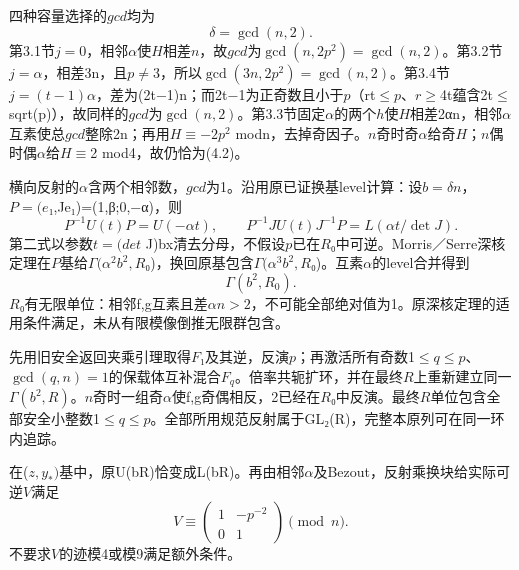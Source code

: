 {四种容量选择的\ensuremath{gcd}均为} \[
\boxed{\delta=\gcd(n,2).}
\tag{C18.4.2}
\] {第3.1节\ensuremath{j=0}，相邻\ensuremath{\alpha }使\ensuremath{H}相差\ensuremath{n}，故\ensuremath{gcd}为\ensuremath{\operatorname{gcd}(n,2p^{2})=\operatorname{gcd}(n,2)}。第3.2节\ensuremath{j=\alpha }，相差3n，且\ensuremath{p}\ensuremath{\ne}3，所以\ensuremath{\operatorname{gcd}(3n,2p^{2})=\operatorname{gcd}(n,2)}。第3.4节\ensuremath{j=(t-1)\alpha }，差为(2t−1)n；而2t−1为正奇数且小于\ensuremath{p}（rt\ensuremath{\le}\ensuremath{p}、\ensuremath{r}\ensuremath{\ge}4t蕴含2t\ensuremath{\le}sqrt(p)），故同样的\ensuremath{gcd}为\ensuremath{\operatorname{gcd}(n,2)}。第3.3节固定\ensuremath{\alpha }的两个\ensuremath{h}使\ensuremath{H}相差2αn，相邻\ensuremath{\alpha }互素使总\ensuremath{gcd}整除2n；再用\ensuremath{H}\ensuremath{\equiv}−\ensuremath{2p^{2}}} {modn，去掉奇因子。\ensuremath{n}奇时奇\ensuremath{\alpha }给奇\ensuremath{H}；\ensuremath{n}偶时偶\ensuremath{\alpha }给\ensuremath{H}\ensuremath{\equiv}2} {mod4，故仍恰为(4.2)。}

{横向反射的\ensuremath{\alpha }含两个相邻数，\ensuremath{gcd}为1。沿用原已证换基level计算：设\ensuremath{b=\delta n}，\ensuremath{P=(e}₁,Je₁)=(1,β;0,−α)，则} \[
P^{-1}U(t)P=U(-\alpha t),\qquad
P^{-1}JU(t)J^{-1}P=L(\alpha t/\det J).
\] {第二式以参数\ensuremath{t=(det}} {J)bx清去分母，不假设\ensuremath{p}已在\ensuremath{R}₀中可逆。Morris／Serre深核定理在\ensuremath{P}基给\ensuremath{\Gamma (\alpha ^{2}b^{2},R}₀)，换回原基包含\ensuremath{\Gamma (\alpha ^{3}b^{2},R}₀)。互素\ensuremath{\alpha }的level合并得到} \[
\boxed{\Gamma(b^2,R_0).}
\tag{C18.4.3}
\] {\ensuremath{R}₀有无限单位：相邻f,g互素且差\ensuremath{\alpha n>2}，不可能全部绝对值为1。原深核定理的适用条件满足，未从有限模像倒推无限群包含。}

{先用旧安全返回夹乘引理取得\ensuremath{F}₁及其逆，反演\ensuremath{p}；再激活所有奇数1\ensuremath{\le}\ensuremath{q}\ensuremath{\le}\ensuremath{p}、\ensuremath{\operatorname{gcd}(q,n)=1}的保载体互补混合\ensuremath{F_{q}}。倍率共轭扩环，并在最终\ensuremath{R}上重新建立同一\ensuremath{\Gamma (b^{2},R)}。\ensuremath{n}奇时一组奇\ensuremath{\alpha }使f,g奇偶相反，2已经在\ensuremath{R}₀中反演。最终\ensuremath{R}单位包含全部安全小整数1\ensuremath{\le}\ensuremath{q}\ensuremath{\le}\ensuremath{p}。全部所用规范反射属于GL₂(R)，完整本原列可在同一环内追踪。}

{在(\ensuremath{z,y_*)}基中，原U(bR)恰变成L(bR)。再由相邻\ensuremath{\alpha }及Bezout，反射乘换块给实际可逆\ensuremath{V}满足} \[
V\equiv\begin{pmatrix}1&-p^{-2}\\0&1\end{pmatrix}\pmod n.
\tag{C18.4.4}
\] {不要求\ensuremath{V}的迹模4或模9满足额外条件。}

